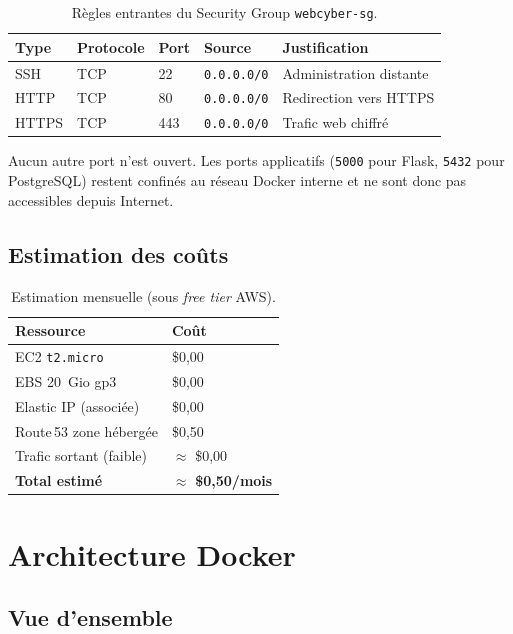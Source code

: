 \begin{table}[H]
\centering
\caption{Règles entrantes du Security Group \texttt{webcyber-sg}.}
\begin{tabular}{C{2cm} C{2cm} C{1.5cm} P{4cm} P{4cm}}
\toprule
\textbf{Type} & \textbf{Protocole} & \textbf{Port} & \textbf{Source} & \textbf{Justification} \\
\midrule
SSH   & TCP & 22  & \texttt{0.0.0.0/0} & Administration distante \\
HTTP  & TCP & 80  & \texttt{0.0.0.0/0} & Redirection vers HTTPS \\
HTTPS & TCP & 443 & \texttt{0.0.0.0/0} & Trafic web chiffré \\
\bottomrule
\end{tabular}
\end{table}

Aucun autre port n'est ouvert. Les ports applicatifs (\texttt{5000}
pour Flask, \texttt{5432} pour PostgreSQL) restent confinés au réseau
Docker interne et ne sont donc pas accessibles depuis Internet.

\subsection{Estimation des coûts}

\begin{table}[H]
\centering
\caption{Estimation mensuelle (sous \emph{free tier} AWS).}
\begin{tabular}{P{6cm} R{3cm}}
\toprule
\textbf{Ressource} & \textbf{Coût} \\
\midrule
EC2 \texttt{t2.micro}            & \$0,00 \\
EBS 20~Gio gp3                   & \$0,00 \\
Elastic IP (associée)            & \$0,00 \\
Route\,53 zone hébergée          & \$0,50 \\
Trafic sortant (faible)          & $\approx$ \$0,00 \\
\midrule
\textbf{Total estimé}            & $\approx$ \textbf{\$0,50/mois} \\
\bottomrule
\end{tabular}
\end{table}

\section{Architecture Docker}

\subsection{Vue d'ensemble}

